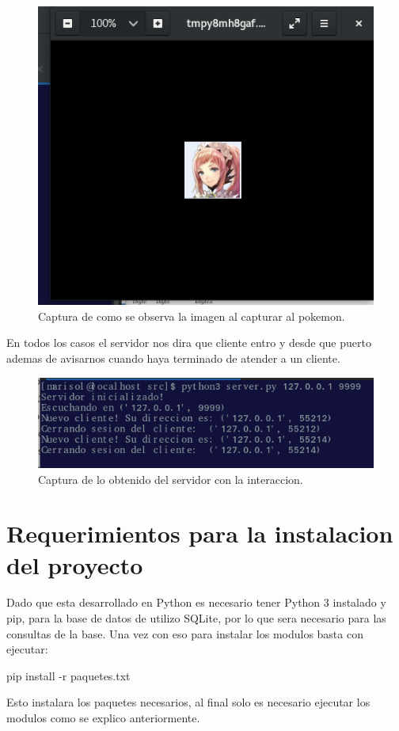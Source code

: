 \documentclass[11pt,letterpaper]{article}
\begin{document}
\begin{itemize}
	\begin{figure}[h!]
		\centering
		\includegraphics[width=0.4\linewidth]{cachado2}
		\caption{Captura de como se observa la imagen al capturar al pokemon.}
		\label{fig:cachado2}
	\end{figure}
	
\end{itemize}

En todos los casos el servidor nos dira que cliente entro y desde que puerto ademas de avisarnos cuando haya terminado de atender a un cliente.

\begin{figure}[h!]
	\centering
	\includegraphics[width=0.7\linewidth]{servidorF}
	\caption{Captura de lo obtenido del servidor con la interaccion.}
	\label{fig:servidorf}
\end{figure}


\section{Requerimientos para la instalacion del proyecto}

Dado que esta desarrollado en Python es necesario tener Python 3 instalado y pip, para la base de datos de utilizo SQLite, por lo que sera necesario para las consultas de la base. Una vez con eso para instalar los modulos basta con ejecutar: 

	\textsf{pip install -r paquetes.txt}
	
	Esto instalara los paquetes necesarios, al final solo es necesario ejecutar los modulos como se explico anteriormente.
\end{document}
